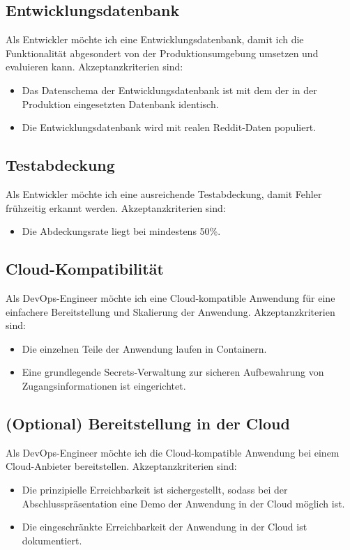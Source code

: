 \documentclass[a4paper, 10pt, conference]{ieeeconf}
\begin{document}
\subsection{Entwicklungsdatenbank}

Als Entwickler möchte ich eine Entwicklungsdatenbank, damit ich die Funktionalität abgesondert von der Produktionsumgebung umsetzen und evaluieren kann. Akzeptanzkriterien sind:
\begin{itemize}
\item Das Datenschema der Entwicklungsdatenbank ist mit dem der in der Produktion eingesetzten Datenbank identisch.
\item Die Entwicklungsdatenbank wird mit realen Reddit-Daten populiert.
\end{itemize}

\subsection{Testabdeckung}

Als Entwickler möchte ich eine ausreichende Testabdeckung, damit Fehler frühzeitig erkannt werden.  Akzeptanzkriterien sind:
\begin{itemize}
\item Die Abdeckungsrate liegt bei mindestens 50\%.
\end{itemize}

\subsection{Cloud-Kompatibilität}

Als DevOps-Engineer möchte ich eine Cloud-kompatible Anwendung für eine einfachere Bereitstellung und Skalierung der Anwendung. Akzeptanzkriterien sind:
\begin{itemize}
\item Die einzelnen Teile der Anwendung laufen in Containern.
\item Eine grundlegende Secrets-Verwaltung zur sicheren Aufbewahrung von Zugangsinformationen ist eingerichtet.
\end{itemize}

\subsection{(Optional) Bereitstellung in der Cloud}

Als DevOps-Engineer möchte ich die Cloud-kompatible Anwendung bei einem Cloud-Anbieter bereitstellen.  Akzeptanzkriterien sind:
\begin{itemize}
\item Die prinzipielle Erreichbarkeit ist sichergestellt, sodass bei der Abschlusspräsentation eine Demo der Anwendung in der Cloud möglich ist.
\item Die eingeschränkte Erreichbarkeit der Anwendung in der Cloud ist dokumentiert.
\end{itemize}
\end{document}
